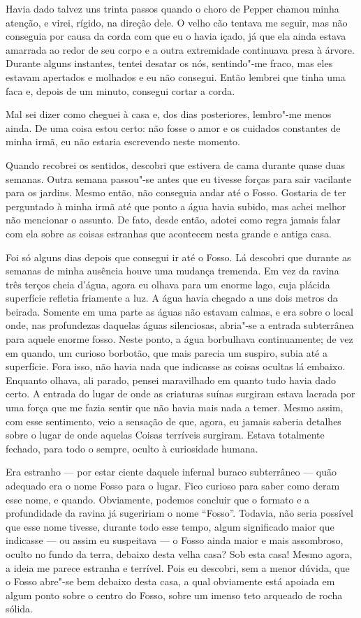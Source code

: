 Havia dado talvez uns trinta passos quando o choro de Pepper chamou minha atenção, e virei, rígido, na direção dele. O
velho cão tentava me seguir, mas não conseguia por causa da corda com que eu o havia içado, já que ela ainda estava
amarrada ao redor de seu corpo e a outra extremidade continuava presa à árvore. Durante alguns instantes, tentei
desatar os nós, sentindo"-me fraco, mas eles estavam apertados e molhados e eu não consegui. Então lembrei que tinha
uma faca e, depois de um minuto, consegui cortar a corda.

Mal sei dizer como cheguei à casa e, dos dias posteriores, lembro"-me menos ainda. De uma coisa estou certo: não fosse o
amor e os cuidados constantes de minha irmã, eu não estaria escrevendo neste momento.

Quando recobrei os sentidos, descobri que estivera de cama durante quase duas semanas. Outra semana passou"-se antes que
eu tivesse forças para sair vacilante para os jardins. Mesmo então, não conseguia andar até o Fosso. Gostaria
de ter perguntado à minha irmã até que ponto a água havia subido, mas achei melhor não mencionar o assunto. De fato,
desde então, adotei como regra jamais falar com ela sobre as coisas estranhas que acontecem nesta grande e antiga casa.

Foi só alguns dias depois que consegui ir até o Fosso. Lá descobri que durante as semanas de minha ausência houve uma
mudança tremenda. Em vez da ravina três terços cheia d'água, agora eu olhava para um enorme lago, cuja plácida
superfície refletia friamente a luz. A água havia chegado a uns dois metros da beirada. Somente em uma parte as águas
não estavam calmas, e era sobre o local onde, nas profundezas daquelas águas silenciosas, abria"-se a entrada subterrânea para
aquele enorme fosso. Neste ponto, a água borbulhava continuamente; de vez em quando, um curioso
borbotão, que mais parecia um suspiro, subia até a superfície. Fora isso, não havia nada que indicasse as coisas
ocultas lá embaixo. Enquanto olhava, ali parado, pensei maravilhado em quanto tudo havia dado certo. A entrada do lugar
de onde as criaturas suínas surgiram estava lacrada por uma força que me fazia sentir que não havia mais nada a temer. Mesmo assim, com esse sentimento, veio a sensação de que, agora, eu jamais saberia detalhes sobre o lugar
de onde aquelas Coisas terríveis surgiram. Estava totalmente fechado, para todo o sempre, oculto à curiosidade humana.

Era estranho --- por estar ciente daquele infernal buraco subterrâneo --- quão adequado era o nome Fosso para o lugar.
Fico curioso para saber como deram esse nome, e quando. Obviamente, podemos concluir que o formato e a profundidade da
ravina já sugeririam o nome “Fosso”. Todavia, não seria possível que esse nome tivesse, durante todo esse tempo, algum
significado maior que indicasse --- ou assim eu suspeitava --- o Fosso ainda maior e mais assombroso, oculto no fundo da
terra, debaixo desta velha casa? Sob esta casa! Mesmo agora, a ideia me parece estranha e terrível. Pois eu descobri,
sem a menor dúvida, que o Fosso abre"-se bem debaixo desta casa, a qual obviamente está apoiada em algum ponto sobre o
centro do Fosso, sobre um imenso teto arqueado de rocha sólida.

